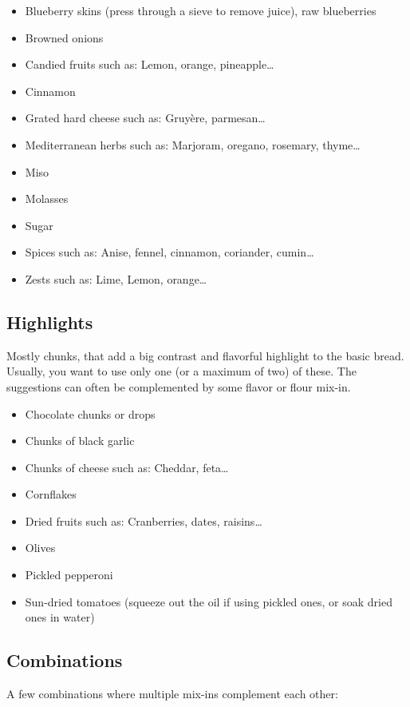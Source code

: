 \begin{itemize}
  \item Blueberry skins (press through a sieve to remove juice), raw
      blueberries
  \item Browned onions
  \item Candied fruits such as: Lemon, orange, pineapple\dots{}
  \item Cinnamon
  \item Grated hard cheese such as: Gruyère, parmesan\dots{}
  \item Mediterranean herbs such as: Marjoram, oregano, rosemary, thyme\dots{}
  \item Miso
  \item Molasses
  \item Sugar
  \item Spices such as: Anise, fennel, cinnamon, coriander, cumin\dots{}
  \item Zests such as: Lime, Lemon, orange\dots{}
\end{itemize}

\subsection{Highlights}
Mostly chunks, that add a big contrast and flavorful highlight to the basic
bread. Usually, you want to use only one (or a maximum of two) of these. The suggestions
can often be complemented by some flavor or flour mix-in.

\begin{itemize}
  \item Chocolate chunks or drops
  \item Chunks of black garlic
  \item Chunks of cheese such as: Cheddar, feta\dots{}
  \item Cornflakes
  \item Dried fruits such as: Cranberries, dates, raisins\dots{}
  \item Olives
  \item Pickled pepperoni
  \item Sun-dried tomatoes (squeeze out the oil if using pickled ones, or soak
      dried ones in water)
\end{itemize}

\subsection{Combinations}
A few combinations where multiple mix-ins complement each other:

